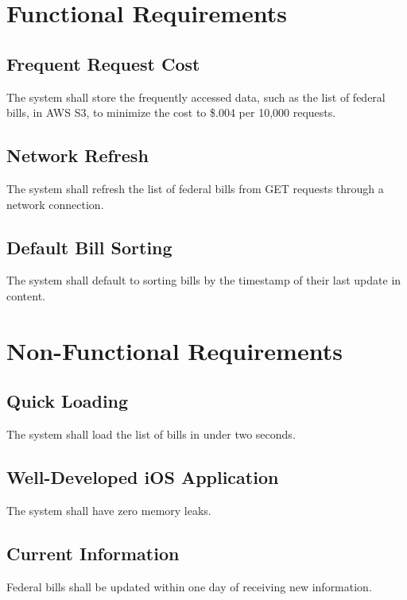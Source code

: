\documentclass[11pt,oneside,letterpaper]{article}   	%
\begin{document}
\section{Functional Requirements}
\subsection{Frequent Request Cost}
The system shall store the frequently accessed data, such as the list of federal bills, in AWS S3, to minimize the cost to \$.004 per 10,000 requests.

\subsection{Network Refresh}
The system shall refresh the list of federal bills from GET requests through a network connection.

\subsection{Default Bill Sorting}
The system shall default to sorting bills by the timestamp of their last update in content.

\section{Non-Functional Requirements}
\subsection{Quick Loading}
The system shall load the list of bills in under two seconds.

\subsection{Well-Developed iOS Application}
The system shall have zero memory leaks.

\subsection{Current Information}
Federal bills shall be updated within one day of receiving new information.
\end{document}
